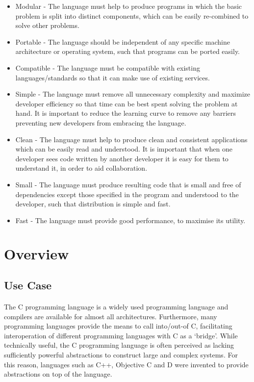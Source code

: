 \documentclass{article}
\begin{document}
\begin{itemize}
\item Modular - The language must help to produce programs in which the basic problem is split into distinct components, which can be easily re-combined to solve other problems.
\item Portable - The language should be independent of any specific machine architecture or operating system, such that programs can be ported easily.
\item Compatible - The language must be compatible with existing languages/standards so that it can make use of existing services.
\item Simple - The language must remove all unnecessary complexity and maximize developer efficiency so that time can be best spent solving the problem at hand. It is important to reduce the learning curve to remove any barriers preventing new developers from embracing the language.
\item Clean - The language must help to produce clean and consistent applications which can be easily read and understood. It is important that when one developer sees code written by another developer it is easy for them to understand it, in order to aid collaboration.
\item Small - The language must produce resulting code that is small and free of dependencies except those specified in the program and understood to the developer, such that distribution is simple and fast.
\item Fast - The language must provide good performance, to maximise its utility.
\end{itemize}

\section{Overview}

\subsection{Use Case}

\paragraph{}
The C programming language is a widely used programming language and compilers are available for almost all architectures. Furthermore, many programming languages provide the means to call into/out-of C, facilitating interoperation of different programming languages with C as a `bridge'. While technically useful, the C programming language is often perceived as lacking sufficiently powerful abstractions to construct large and complex systems. For this reason, languages such as C++, Objective C and D were invented to provide abstractions on top of the language.
\end{document}

